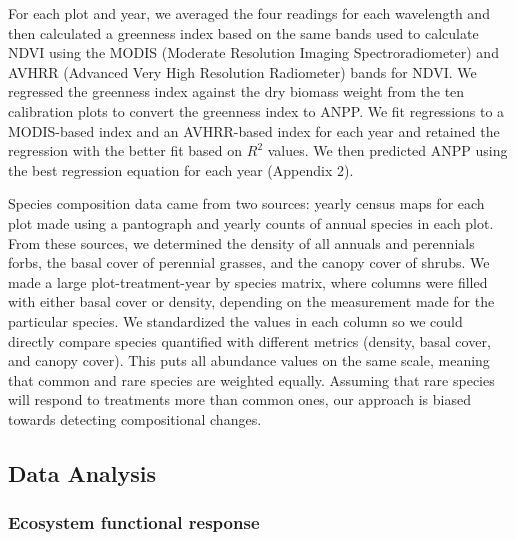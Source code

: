 \documentclass[fleqn,10pt,lineno]{wlpeerj} %
\begin{document}
For each plot and year, we averaged the four readings for each
wavelength and then calculated a greenness index based on the same bands
used to calculate NDVI using the MODIS (Moderate Resolution Imaging
Spectroradiometer) and AVHRR (Advanced Very High Resolution Radiometer)
bands for NDVI. We regressed the greenness index against the dry biomass
weight from the ten calibration plots to convert the greenness index to
ANPP. We fit regressions to a MODIS-based index and an AVHRR-based index
for each year and retained the regression with the better fit based on
\(R^2\) values. We then predicted ANPP using the best regression
equation for each year (Appendix 2).

Species composition data came from two sources: yearly census maps for
each plot made using a pantograph \citep{Hill1920} and yearly counts of
annual species in each plot.
From these sources, we determined the density of all annuals and
perennials forbs, the basal cover of perennial grasses, and the canopy
cover of shrubs. We made a large plot-treatment-year by species matrix,
where columns were filled with either basal cover or density, depending
on the measurement made for the particular species. We standardized the
values in each column so we could directly compare species quantified
with different metrics (density, basal cover, and canopy cover). This
puts all abundance values on the same scale, meaning that common and
rare species are weighted equally. Assuming that rare species will
respond to treatments more than common ones, our approach is biased
towards detecting compositional changes.

\subsection{Data Analysis}\label{data-analysis}

\subsubsection{Ecosystem functional
response}\label{ecosystem-functional-response}
\end{document}
